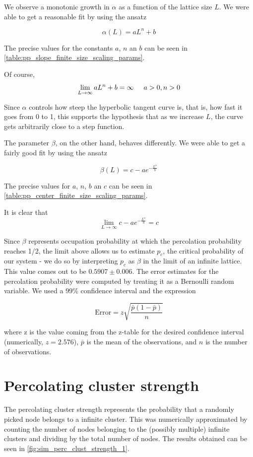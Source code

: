 We observe a monotonic growth in $\alpha$ as a function of the lattice size $L$. We were able to get a reasonable fit by using the ansatz

$$ 
    \alpha(L) = a L^n + b
$$

The precise values for the constants $a$, $n$ an $b$ can be seen in \autoref{table:pp_slope_finite_size_scaling_params}.

Of course, 
$$ 
\lim_{L\to\infty} a L^n + b = \infty \hspace{0.5cm} a > 0, n>0
$$

Since $\alpha$ controls how steep the hyperbolic tangent curve is, that is, how fast it goes from 0 to 1, this supports the hypothesis that as we increase $L$, the curve gets arbitrarily close to a step function. 


The parameter $\beta$, on the other hand, behaves differently. We were able to get a fairly good fit by using the ansatz 

$$ 
\beta(L) = c - a e^{-\frac{L^n}{b}}
$$ 

The precise values for $a$, $n$, $b$ an $c$ can be seen in \autoref{table:pp_center_finite_size_scaling_params}. 

It is clear that 
$$ 
\lim_{L\to\infty} c - a e^{-\frac{L^n}{b}} = c
$$

Since $\beta$ represents occupation probability at which the percolation probability reaches 1/2, the limit above allows us to estimate $p_c$, the critical probability of our system - we do so by interpreting $p_c$ as $\beta$ in the limit of an infinite lattice. This value comes out to be $\mathbf{0.5907} \pm 0.006$.
The error estimates for the percolation probability were computed by treating it as a Bernoulli random variable. We used a 99\% confidence interval and the expression 

$$ 
\textrm{Error} = z \sqrt{\frac{\bar{p}(1-\bar{p})}{n}}
$$

where z is the value coming from the z-table for the desired confidence interval (numerically, $z=2.576$), $\bar{p}$ is the mean of the observations, and $n$ is the number of observations\cite{bertsekas2008introduction}.

\section{Percolating cluster strength}
\label{sec:sim_perc_clust_strength}

The percolating cluster strength represents the probability that a randomly picked node belongs to a infinite cluster. This was numerically approximated by counting the number of nodes belonging to the (possibly multiple) infinite clusters and dividing by the total number of nodes. The results obtained can be seen in \autoref{fig:sim_perc_clust_strength_1}.

